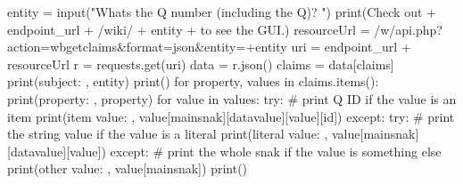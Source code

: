 \documentclass[
  letterpaper,
  DIV=11,
  numbers=noendperiod]{scrreprt}
\newenvironment{Shaded}{\begin{snugshade}}{\end{snugshade}}
\newcommand{\BuiltInTok}[1]{\textcolor[rgb]{0.00,0.23,0.31}{#1}}
\newcommand{\CommentTok}[1]{\textcolor[rgb]{0.37,0.37,0.37}{#1}}
\newcommand{\ControlFlowTok}[1]{\textcolor[rgb]{0.00,0.23,0.31}{#1}}
\newcommand{\KeywordTok}[1]{\textcolor[rgb]{0.00,0.23,0.31}{#1}}
\newcommand{\NormalTok}[1]{\textcolor[rgb]{0.00,0.23,0.31}{#1}}
\newcommand{\OperatorTok}[1]{\textcolor[rgb]{0.37,0.37,0.37}{#1}}
\newcommand{\StringTok}[1]{\textcolor[rgb]{0.13,0.47,0.30}{#1}}
\begin{document}
\begin{Shaded}
\begin{Highlighting}[]
\NormalTok{entity }\OperatorTok{=} \BuiltInTok{input}\NormalTok{(}\StringTok{"What\textquotesingle{}s the Q number (including the \textquotesingle{}Q\textquotesingle{})? "}\NormalTok{)}
\BuiltInTok{print}\NormalTok{(}\StringTok{\textquotesingle{}Check out \textquotesingle{}} \OperatorTok{+}\NormalTok{ endpoint\_url }\OperatorTok{+} \StringTok{\textquotesingle{}/wiki/\textquotesingle{}} \OperatorTok{+}\NormalTok{ entity }\OperatorTok{+} \StringTok{\textquotesingle{} to see the GUI.\textquotesingle{}}\NormalTok{)}
\NormalTok{resourceUrl }\OperatorTok{=} \StringTok{\textquotesingle{}/w/api.php?action=wbgetclaims\&format=json\&entity=\textquotesingle{}}\OperatorTok{+}\NormalTok{entity}
\NormalTok{uri }\OperatorTok{=}\NormalTok{ endpoint\_url }\OperatorTok{+}\NormalTok{ resourceUrl}
\NormalTok{r }\OperatorTok{=}\NormalTok{ requests.get(uri)}
\NormalTok{data }\OperatorTok{=}\NormalTok{ r.json()}
\NormalTok{claims }\OperatorTok{=}\NormalTok{ data[}\StringTok{\textquotesingle{}claims\textquotesingle{}}\NormalTok{]}
\BuiltInTok{print}\NormalTok{(}\StringTok{\textquotesingle{}subject: \textquotesingle{}}\NormalTok{, entity)}
\BuiltInTok{print}\NormalTok{()}
\ControlFlowTok{for} \BuiltInTok{property}\NormalTok{, values }\KeywordTok{in}\NormalTok{ claims.items():}
    \BuiltInTok{print}\NormalTok{(}\StringTok{\textquotesingle{}property: \textquotesingle{}}\NormalTok{, }\BuiltInTok{property}\NormalTok{)}
    \ControlFlowTok{for}\NormalTok{ value }\KeywordTok{in}\NormalTok{ values:}
        \ControlFlowTok{try}\NormalTok{:}
            \CommentTok{\# print Q ID if the value is an item}
            \BuiltInTok{print}\NormalTok{(}\StringTok{\textquotesingle{}item value: \textquotesingle{}}\NormalTok{, value[}\StringTok{\textquotesingle{}mainsnak\textquotesingle{}}\NormalTok{][}\StringTok{\textquotesingle{}datavalue\textquotesingle{}}\NormalTok{][}\StringTok{\textquotesingle{}value\textquotesingle{}}\NormalTok{][}\StringTok{\textquotesingle{}id\textquotesingle{}}\NormalTok{])}
        \ControlFlowTok{except}\NormalTok{:}
            \ControlFlowTok{try}\NormalTok{:}
                \CommentTok{\# print the string value if the value is a literal}
                \BuiltInTok{print}\NormalTok{(}\StringTok{\textquotesingle{}literal value: \textquotesingle{}}\NormalTok{, value[}\StringTok{\textquotesingle{}mainsnak\textquotesingle{}}\NormalTok{][}\StringTok{\textquotesingle{}datavalue\textquotesingle{}}\NormalTok{][}\StringTok{\textquotesingle{}value\textquotesingle{}}\NormalTok{])}
            \ControlFlowTok{except}\NormalTok{:}
                \CommentTok{\# print the whole snak if the value is something else}
                \BuiltInTok{print}\NormalTok{(}\StringTok{\textquotesingle{}other value: \textquotesingle{}}\NormalTok{, value[}\StringTok{\textquotesingle{}mainsnak\textquotesingle{}}\NormalTok{])}
    \BuiltInTok{print}\NormalTok{()}
\end{Highlighting}
\end{Shaded}
\end{document}
